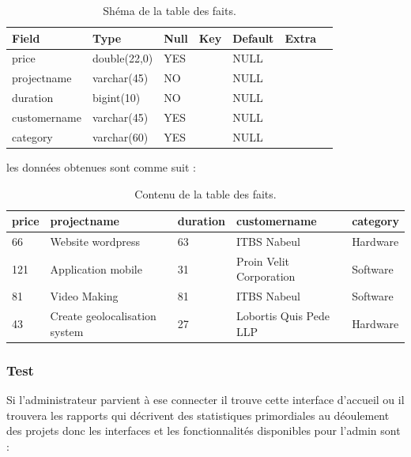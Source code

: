 \begin{table}

\begin{tabular}{|l|l|l|l|l|l|l|}
\hline
Field        & Type         & Null & Key & Default & Extra &   \\
\hline
price        & double(22,0) & YES  &     & NULL    &       &   \\
\hline
projectname  & varchar(45)  & NO   &     & NULL    &       &   \\
\hline
duration     & bigint(10)   & NO   &     & NULL    &       &   \\
\hline
customername & varchar(45)  & YES  &     & NULL    &       &   \\
\hline
category     & varchar(60)  & YES  &     & NULL    &       &   \\
\hline
\end{tabular}
\centering
\caption{Sh\'{e}ma de la table des faits.}
\end{table}
\FloatBarrier


les donn\'{e}es obtenues sont comme suit :
\FloatBarrier
\begin{table}

\begin{tabular}{|l|l|l|l|l|}
\hline
price & projectname                   & duration & customername            & category  \\
\hline
66    & Website wordpress             & 63       & ITBS Nabeul             & Hardware  \\
\hline
121   & Application mobile            & 31       & Proin Velit Corporation & Software  \\
\hline
81    & Video Making                  & 81       & ITBS Nabeul             & Software  \\
\hline
43    & Create geolocalisation system & 27       & Lobortis Quis Pede LLP  & Hardware  \\
\hline
\end{tabular}
\centering
\caption{Contenu de la table des faits.}
\end{table}
\FloatBarrier




\subsubsection{Test}

Si l'administrateur parvient \`{a} ese connecter il trouve cette interface d'accueil
ou il trouvera les rapports qui d\'{e}crivent des statistiques primordiales au
d\'{e}oulement des projets donc les interfaces et les fonctionnalit\'{e}s disponibles
pour l'admin sont :

